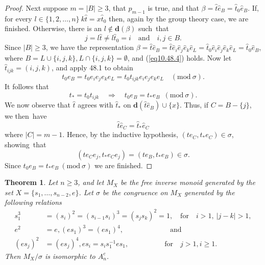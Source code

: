 \documentclass{surv-l}
\numberwithin{equation}{section}
\numberwithin{table}{section}
\numberwithin{figure}{section}
\newtheorem{theorem}[equation]{Theorem}
\theoremstyle{definition}
\begin{document}
\begin{proof}
Next suppose $m=|B|\geq 3$, that $p_{m-1}$ is true, and that
$\beta=\widehat{t}\widehat{e}_{B}=\widehat{t}_{0}\widehat{e}_{B}$.
If, for every $l\in\{1,2,\ldots, n\}\
k\widehat{t}=x\widehat{t}_{0}$ then, again by the group theory
case, we are finished. Otherwise, there is an $l\not\in
\mathbf{d}(\beta)$ such~that
\begin{equation}\label{eq10.48.4}
 j=l\widehat{t}\neq l\widehat{t}_{0}=i\quad \mathrm{and}\quad i,j \in B.
\end{equation}
Since $|B|\geq 3$, we have the representation
$\beta=\widehat{t}\widehat{e}_{B}=\widehat{t}\widehat{e}_{i}\widehat{e}_{j}\widehat{e}_{k}
\widehat{e}_{L}=\widehat{t}_{0}\widehat{e}_{i}\widehat{e}_{j}\widehat{e}_{k}\widehat{e}_{L}
=\widehat{t}_{0}\widehat{e}_{B}$, where $B=L\cup\{i, j, k\},
L\cap\{i, j, k\}=\emptyset$, and (\ref{eq10.48.4}) holds. Now let
$\widehat{t}_{ijk}=(i,j,k)$, and apply 48.1 to obtain
\[
t_{0}e_{B}=t_{0}e_{i}e_{j}e_{k}e_{L}=t_{0}t_{ijk}e_{i}e_{j}e_{k}e_{L}\quad (\mathrm{mod}\ \sigma).
\]
It follows that
\[
t_{\ast}=t_{0}t_{ijk}\quad \Rightarrow\quad t_{0}e_{B}=t_{\ast}e_{B}\enspace (\mathrm{mod}\ \sigma).
\]
We now observe that $\widehat{t}$ agrees with $\widehat{t}_{\ast}$
on $\mathbf{d}(\widehat{t}\widehat{e}_{B})\cup\{x\}$. Thus, if
$C=B-\{j\}$, we then~have
\[
\widehat{t}\widehat{e}_{C}=\widehat{t}_{\ast}\widehat{e}_{C}
\]
where $|C|=m-1$. Hence, by the inductive hypothesis, $(te_{C},
t_{\ast}e_{C})\in\sigma$, showing~that
\[
(te_{C}e_{j}, t_{\ast}e_{C}e_{j})=(te_{B}, t_{\ast}e_{B})\in\sigma.
\]
Since $t_{0}e_{B}=t_{\ast}e_{B}\ (\mathrm{mod}\ \sigma)$ we are
finished.
\end{proof}

\begin{theorem}\label{thm10.48.5}
Let $n\geq 3$, and let $M_{X}$ be the free inverse monoid
generated by the set $X=\{s_{1},\ldots, s_{n-2}, e\}$. Let
$\sigma$ be the congruence on $M_{X}$ generated by the following
relations
\begin{align*}
s_{1}^{3} &=(s_{i})^{2}=(s_{i-1}s_{i})^{3}=(s_{j}s_{k})^{2}=1,\quad  \text{for}\quad i>1,\ |j-k|>1, \\
e^{2}&=e, (es_{1})^{3}= (es_1)^{4},\qquad\qquad\qquad\enspace \text{and} \\
(es_{j})^{2}&=(es_{j})^{4}, es_{i}=s_{i}s_{1}^{-1}es_{1},\qquad\qquad\quad \text{for}\quad j>1, i\geq 1.
\end{align*}
Then $M_{X}/\sigma$ is isomorphic to $A_{n}^{c}$.
\end{theorem}
\end{document}

